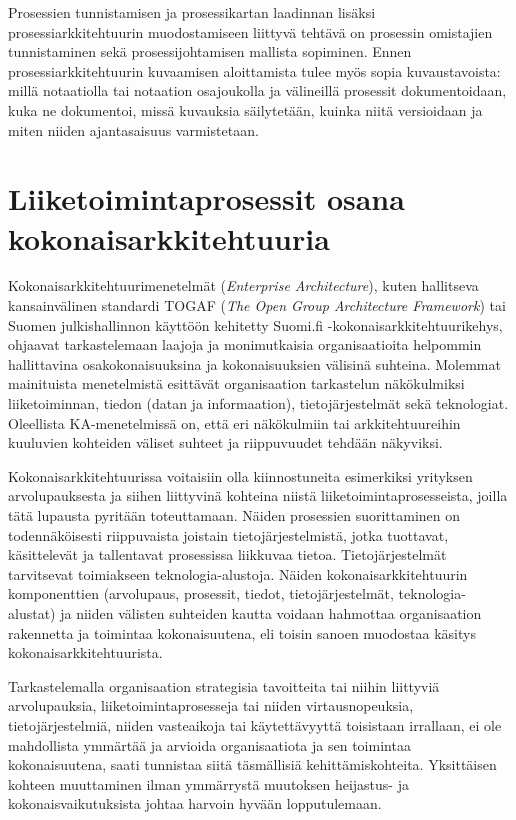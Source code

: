 \documentclass[
  finnish,
  letterpaper,
  DIV=11,
  numbers=noendperiod,
  oneside]{scrreprt}
\begin{document}
Prosessien tunnistamisen ja prosessikartan laadinnan lisäksi
prosessiarkkitehtuurin muodostamiseen liittyvä tehtävä on prosessin
omistajien tunnistaminen sekä prosessijohtamisen mallista sopiminen.
Ennen prosessiarkkitehtuurin kuvaamisen aloittamista tulee myös sopia
kuvaustavoista: millä notaatiolla tai notaation osajoukolla ja
välineillä prosessit dokumentoidaan, kuka ne dokumentoi, missä kuvauksia
säilytetään, kuinka niitä versioidaan ja miten niiden ajantasaisuus
varmistetaan.

\section{Liiketoimintaprosessit osana
kokonaisarkkitehtuuria}\label{liiketoimintaprosessit-osana-kokonaisarkkitehtuuria}

Kokonaisarkkitehtuurimenetelmät (\emph{Enterprise Architecture}), kuten
hallitseva kansainvälinen standardi TOGAF
(\emph{The Open Group Architecture Framework}) tai Suomen
julkishallinnon käyttöön kehitetty Suomi.fi
-kokonaisarkkitehtuurikehys,
ohjaavat tarkastelemaan laajoja ja monimutkaisia organisaatioita
helpommin hallittavina osakokonaisuuksina ja kokonaisuuksien välisinä
suhteina. Molemmat mainituista menetelmistä esittävät organisaation
tarkastelun näkökulmiksi liiketoiminnan, tiedon (datan ja informaation),
tietojärjestelmät sekä teknologiat. Oleellista KA-menetelmissä on, että
eri näkökulmiin tai arkkitehtuureihin kuuluvien kohteiden väliset
suhteet ja riippuvuudet tehdään näkyviksi.

Kokonaisarkkitehtuurissa voitaisiin olla kiinnostuneita esimerkiksi
yrityksen arvolupauksesta ja siihen liittyvinä kohteina niistä
liiketoimintaprosesseista, joilla tätä lupausta pyritään toteuttamaan.
Näiden prosessien suorittaminen on todennäköisesti riippuvaista joistain
tietojärjestelmistä, jotka tuottavat, käsittelevät ja tallentavat
prosessissa liikkuvaa tietoa. Tietojärjestelmät tarvitsevat toimiakseen
teknologia-alustoja. Näiden kokonaisarkkitehtuurin komponenttien
(arvolupaus, prosessit, tiedot, tietojärjestelmät, teknologia-alustat)
ja niiden välisten suhteiden kautta voidaan hahmottaa organisaation
rakennetta ja toimintaa kokonaisuutena, eli toisin sanoen muodostaa
käsitys kokonaisarkkitehtuurista.

Tarkastelemalla organisaation strategisia tavoitteita tai niihin
liittyviä arvolupauksia, liiketoimintaprosesseja tai niiden
virtausnopeuksia, tietojärjestelmiä, niiden vasteaikoja tai
käytettävyyttä toisistaan irrallaan, ei ole mahdollista ymmärtää ja
arvioida organisaatiota ja sen toimintaa kokonaisuutena, saati tunnistaa
siitä täsmällisiä kehittämiskohteita. Yksittäisen kohteen muuttaminen
ilman ymmärrystä muutoksen heijastus- ja kokonaisvaikutuksista johtaa
harvoin hyvään lopputulemaan.
\end{document}
